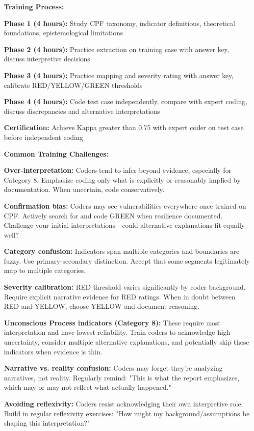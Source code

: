 \documentclass[11pt,a4paper]{article}
\begin{document}
\textbf{Training Process:}

\textbf{Phase 1 (4 hours):} Study CPF taxonomy, indicator definitions, theoretical foundations, epistemological limitations

\textbf{Phase 2 (4 hours):} Practice extraction on training case with answer key, discuss interpretive decisions

\textbf{Phase 3 (4 hours):} Practice mapping and severity rating with answer key, calibrate RED/YELLOW/GREEN thresholds

\textbf{Phase 4 (4 hours):} Code test case independently, compare with expert coding, discuss discrepancies and alternative interpretations

\textbf{Certification:} Achieve Kappa greater than 0.75 with expert coder on test case before independent coding

\textbf{Common Training Challenges:}

\textbf{Over-interpretation:} Coders tend to infer beyond evidence, especially for Category 8. Emphasize coding only what is explicitly or reasonably implied by documentation. When uncertain, code conservatively.

\textbf{Confirmation bias:} Coders may see vulnerabilities everywhere once trained on CPF. Actively search for and code GREEN when resilience documented. Challenge your initial interpretations—could alternative explanations fit equally well?

\textbf{Category confusion:} Indicators span multiple categories and boundaries are fuzzy. Use primary-secondary distinction. Accept that some segments legitimately map to multiple categories.

\textbf{Severity calibration:} RED threshold varies significantly by coder background. Require explicit narrative evidence for RED ratings. When in doubt between RED and YELLOW, choose YELLOW and document reasoning.

\textbf{Unconscious Process indicators (Category 8):} These require most interpretation and have lowest reliability. Train coders to acknowledge high uncertainty, consider multiple alternative explanations, and potentially skip these indicators when evidence is thin.

\textbf{Narrative vs. reality confusion:} Coders may forget they're analyzing narratives, not reality. Regularly remind: "This is what the report emphasizes, which may or may not reflect what actually happened."

\textbf{Avoiding reflexivity:} Coders resist acknowledging their own interpretive role. Build in regular reflexivity exercises: "How might my background/assumptions be shaping this interpretation?"
\end{document}
